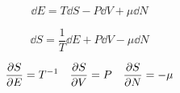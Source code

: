 \documentclass[12pt,a4paper]{article}
\begin{document}
\setcounter{page}{1}

\begin{equation}
	\dd{E} = T\dd{S} - P\dd{V} + \mu\dd{N}
\end{equation}

\begin{equation}
	\dd{S} = \frac{1}{T}\dd{E} + P\dd{V} - \mu\dd{N}
\end{equation}

\begin{equation}
	\pdv{S}{E} = T^{-1} \quad \pdv{S}{V} = P \quad \pdv{S}{N} = -\mu
\end{equation}
\end{document}
